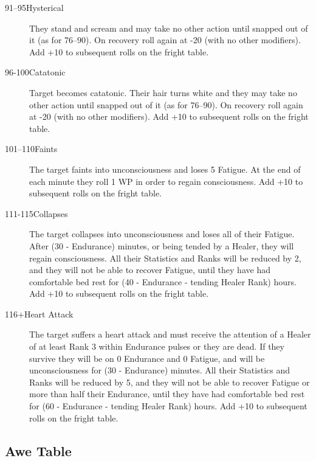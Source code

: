 \begin{multicols}{2}
\begin{description}
\item[91--95\hspace{1.0em}Hysterical]
They stand and scream and may take no other action until snapped out
of it (as for 76--90).  On recovery roll again at -20 (with no other
modifiers).  Add +10 to subsequent rolls on the fright table.

\item[96-100\hspace{1.0em}Catatonic]
Target becomes catatonic.  Their hair turns white and they may take no
other action until snapped out of it (as for 76--90).  On recovery
roll again at -20 (with no other modifiers).  Add +10 to subsequent
rolls on the fright table.

\item[101--110\hspace{1.0em}Faints]
The target faints into unconsciousness and loses 5 Fatigue.  At the
end of each minute they roll 1 \x WP in order to regain consciousness.
Add +10 to subsequent rolls on the fright table.

\item[111-115\hspace{1.0em}Collapses]
The target collapses into unconsciousness and loses all of their
Fatigue.  After (30 - Endurance) minutes, or being tended by a Healer,
they will regain consciousness.  All their Statistics and Ranks will
be reduced by 2, and they will not be able to recover Fatigue, until
they have had comfortable bed rest for (40 - Endurance - tending
Healer Rank) hours.  Add +10 to subsequent rolls on the fright table.

\item[116+\hspace{1.0em}Heart Attack]
The target suffers a heart attack and must receive the attention of a
Healer of at least Rank 3 within Endurance pulses or they are dead.
If they survive they will be on 0 Endurance and 0 Fatigue, and will be
unconsciousness for (30 - Endurance) minutes.  All their Statistics
and Ranks will be reduced by 5, and they will not be able to recover
Fatigue or more than half their Endurance, until they have had
comfortable bed rest for (60 - Endurance - tending Healer Rank) hours.
Add +10 to subsequent rolls on the fright table.

\end{description}

\subsection{Awe Table}
\label{tables:awe}


\end{multicols}
